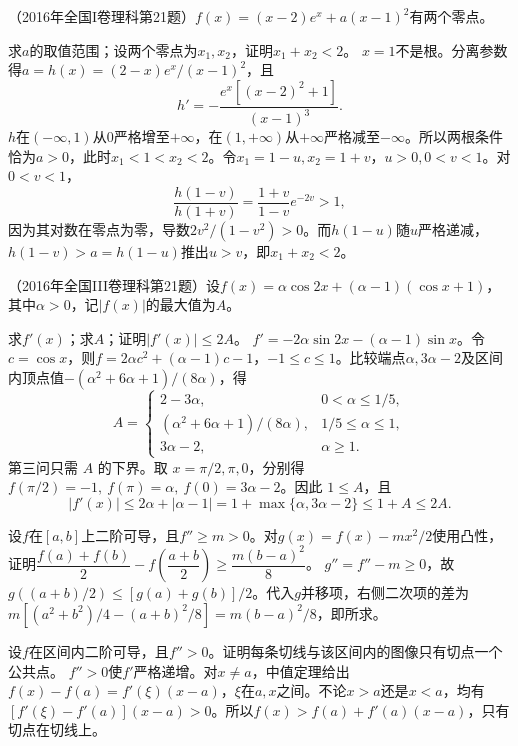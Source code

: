 （2016年全国I卷理科第21题）\(f(x)=(x-2)e^x+a(x-1)^2\)有两个零点。

求\(a\)的取值范围；设两个零点为\(x_1,x_2\)，证明\(x_1+x_2<2\)。
\solutionanswer
\(x=1\)不是根。分离参数得\(a=h(x)=(2-x)e^x/(x-1)^2\)，且
\[
 h'=-\frac{e^x[(x-2)^2+1]}{(x-1)^3}.
\]
\(h\)在\(( -\infty,1)\)从\(0\)严格增至\(+\infty\)，在\((1,+\infty)\)从\(+\infty\)严格减至\(-\infty\)。所以两根条件恰为\(a>0\)，此时\(x_1<1<x_2<2\)。令\(x_1=1-u,x_2=1+v\)，\(u>0,0<v<1\)。对\(0<v<1\)，
\[
 \frac{h(1-v)}{h(1+v)}=\frac{1+v}{1-v}e^{-2v}>1,
\]
因为其对数在零点为零，导数\(2v^2/(1-v^2)>0\)。而\(h(1-u)\)随\(u\)严格递减，\(h(1-v)>a=h(1-u)\)推出\(u>v\)，即\(x_1+x_2<2\)。


（2016年全国III卷理科第21题）设\(f(x)=\alpha\cos2x+(\alpha-1)(\cos x+1)\)，其中\(\alpha>0\)，记\(|f(x)|\)的最大值为\(A\)。

求\(f'(x)\)；求\(A\)；证明\(|f'(x)|\le2A\)。
\solutionanswer
\(f'=-2\alpha\sin2x-(\alpha-1)\sin x\)。令\(c=\cos x\)，则\(f=2\alpha c^2+(\alpha-1)c-1\)，\(-1\le c\le1\)。比较端点\(\alpha,3\alpha-2\)及区间内顶点值\(-(\alpha^2+6\alpha+1)/(8\alpha)\)，得
\[
 A=\begin{cases}2-3\alpha,&0<\alpha\le1/5,\\
 (\alpha^2+6\alpha+1)/(8\alpha),&1/5\le\alpha\le1,\\
 3\alpha-2,&\alpha\ge1.
 \end{cases}
\]
第三问只需 \(A\) 的下界。取 \(x=\pi/2,\pi,0\)，分别得 \(f(\pi/2)=-1,\ f(\pi)=\alpha,\ f(0)=3\alpha-2\)。因此 \(1\le A\)，且
\[
 |f'(x)|\le 2\alpha+|\alpha-1|
 =1+\max\{\alpha,3\alpha-2\}\le 1+A\le 2A .
\]


设\(f\)在\([a,b]\)上二阶可导，且\(f''\ge m>0\)。对\(g(x)=f(x)-mx^2/2\)使用凸性，证明\(\dfrac{f(a)+f(b)}2-f\!\left(\dfrac{a+b}2\right)\ge\dfrac{m(b-a)^2}8\)。
\solutionanswer
\(g''=f''-m\ge0\)，故\(g((a+b)/2)\le[g(a)+g(b)]/2\)。代入\(g\)并移项，右侧二次项的差为\(m[(a^2+b^2)/4-(a+b)^2/8]=m(b-a)^2/8\)，即所求。


设\(f\)在区间内二阶可导，且\(f''>0\)。证明每条切线与该区间内的图像只有切点一个公共点。
\solutionanswer
\(f''>0\)使\(f'\)严格递增。对\(x\ne a\)，中值定理给出\(f(x)-f(a)=f'(\xi)(x-a)\)，\(\xi\)在\(a,x\)之间。不论\(x>a\)还是\(x<a\)，均有\([f'(\xi)-f'(a)](x-a)>0\)。所以\(f(x)>f(a)+f'(a)(x-a)\)，只有切点在切线上。


